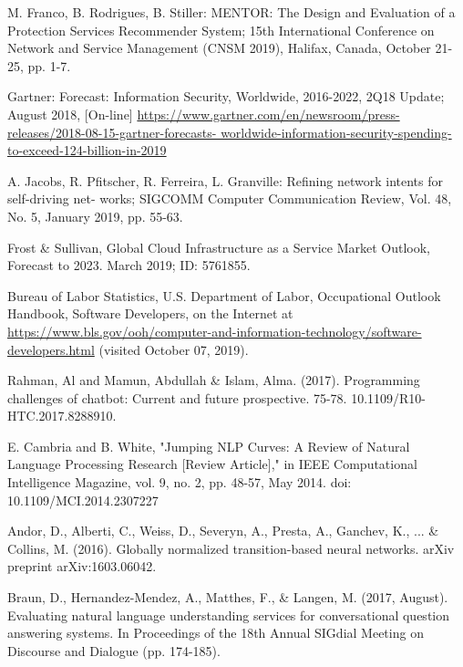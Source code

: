 \begin{thebibliography}{99}

 M. Franco, B. Rodrigues, B. Stiller: MENTOR: The Design and Evaluation of a Protection Services Recommender System; 15th International Conference on Network and Service Management (CNSM 2019), Halifax, Canada, October 21-25, pp. 1-7.

 Gartner: Forecast: Information Security, Worldwide, 2016-2022, 2Q18 Update; August 2018, [On-line] \url{https://www.gartner.com/en/newsroom/press-releases/2018-08-15-gartner-forecasts- worldwide-information-security-spending-to-exceed-124-billion-in-2019}


 A. Jacobs, R. Pfitscher, R. Ferreira, L. Granville: Refining network intents for self-driving net- works; SIGCOMM Computer Communication Review, Vol. 48, No. 5, January 2019, pp. 55-63.

 Frost \& Sullivan, Global Cloud Infrastructure as a Service Market Outlook, Forecast to 2023. March 2019; ID: 5761855.

Bureau of Labor Statistics, U.S. Department of Labor, Occupational Outlook Handbook, Software Developers, 
on the Internet at \url{https://www.bls.gov/ooh/computer-and-information-technology/software-developers.html} (visited October 07, 2019).

Rahman, Al and Mamun, Abdullah \& Islam, Alma. (2017). Programming challenges of chatbot: Current and future prospective. 75-78. 10.1109/R10-HTC.2017.8288910. 

E. Cambria and B. White, "Jumping NLP Curves: A Review of Natural Language Processing Research [Review Article]," in IEEE Computational Intelligence Magazine, vol. 9, no. 2, pp. 48-57, May 2014.
doi: 10.1109/MCI.2014.2307227

 Andor, D., Alberti, C., Weiss, D., Severyn, A., Presta, A., Ganchev, K., ... \& Collins, M. (2016). Globally normalized transition-based neural networks. arXiv preprint arXiv:1603.06042.

 Braun, D., Hernandez-Mendez, A., Matthes, F., \& Langen, M. (2017, August). Evaluating natural language understanding services for conversational question answering systems. In Proceedings of the 18th Annual SIGdial Meeting on Discourse and Dialogue (pp. 174-185).


\end{thebibliography}
